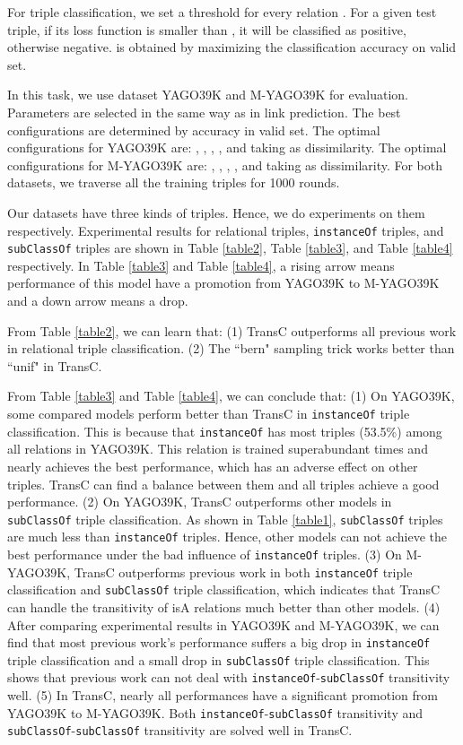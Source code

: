 \documentclass[11pt,a4paper]{article}
\begin{document}
  For triple classification, we set a threshold  for every relation . For a given test triple, 
  if its loss function is smaller than , it will be classified as positive, otherwise negative. 
  is obtained by maximizing the classification accuracy on valid set.
  
  In this task, we use dataset YAGO39K and M-YAGO39K for evaluation.  
  Parameters are selected in the same way as in link prediction.
  The best configurations are determined by accuracy in valid set. The optimal configurations for YAGO39K are:
  , , , ,  and taking  as dissimilarity.
  The optimal configurations for M-YAGO39K are: , , , , 
   and taking  as dissimilarity. For both datasets, we traverse all the training triples for 1000 rounds.
  
  Our datasets have three kinds of triples. Hence, we do experiments on them respectively. Experimental results
  for relational triples, \texttt{instanceOf} triples, and \texttt{subClassOf} triples are shown in Table \ref{table2}, Table \ref{table3}, and Table \ref{table4} respectively.
  In Table \ref{table3} and Table \ref{table4}, a rising arrow means performance of this model have a promotion from YAGO39K to M-YAGO39K and a down arrow
  means a drop.
  
  From Table \ref{table2}, we can learn that: (1) TransC outperforms all previous work 
  in relational triple classification. (2) The ``bern" sampling trick works better than ``unif" in TransC.
  
  From Table \ref{table3} and Table \ref{table4}, we can conclude that: (1) On YAGO39K,  some compared models perform better than TransC in \texttt{instanceOf}
  triple classification. This is because that \texttt{instanceOf} has most triples (53.5\%) among all relations in YAGO39K. 
  This relation is trained superabundant times and nearly achieves the best performance, which has an adverse effect on
  other triples. TransC can find a balance between them and all triples achieve a good performance.
  (2) On YAGO39K, TransC outperforms other models in \texttt{subClassOf} triple classification. As shown in Table \ref{table1}, \texttt{subClassOf} triples are much 
  less than \texttt{instanceOf} triples. Hence, other models can not achieve the best performance under 
  the bad influence of \texttt{instanceOf} triples. (3) On M-YAGO39K, TransC outperforms previous work in both \texttt{instanceOf} triple
  classification and \texttt{subClassOf} triple classification, which indicates that TransC can handle the transitivity of isA relations
  much better than other models. (4) After comparing experimental results in YAGO39K and M-YAGO39K, we can find that most previous work's performance 
  suffers a big drop in \texttt{instanceOf} triple classification and a small drop in \texttt{subClassOf} triple classification.
  This shows that previous work can not deal with \texttt{instanceOf}-\texttt{subClassOf} transitivity well.
  (5) In TransC, nearly all performances have a significant promotion from YAGO39K to M-YAGO39K. Both \texttt{instanceOf}-\texttt{subClassOf} transitivity and
  \texttt{subClassOf}-\texttt{subClassOf} transitivity are solved well in TransC.
  
\end{document}
